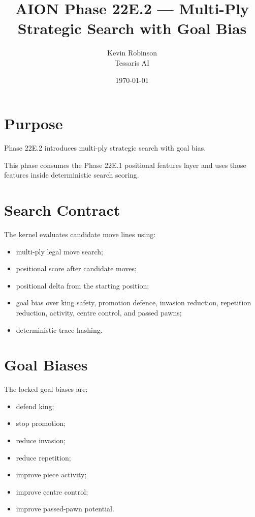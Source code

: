 \documentclass[11pt,a4paper]{article}
\title{\textbf{AION Phase 22E.2 --- Multi-Ply Strategic Search with Goal Bias}}
\author{Kevin Robinson\\Tessaris AI}
\date{\today}
\begin{document}
\maketitle

\section{Purpose}

Phase 22E.2 introduces multi-ply strategic search with goal bias.

This phase consumes the Phase 22E.1 positional features layer and uses those features inside deterministic search scoring.

\section{Search Contract}

The kernel evaluates candidate move lines using:

\begin{itemize}[leftmargin=*]
  \item multi-ply legal move search;
  \item positional score after candidate moves;
  \item positional delta from the starting position;
  \item goal bias over king safety, promotion defence, invasion reduction, repetition reduction, activity, centre control, and passed pawns;
  \item deterministic trace hashing.
\end{itemize}

\section{Goal Biases}

The locked goal biases are:

\begin{itemize}[leftmargin=*]
  \item defend king;
  \item stop promotion;
  \item reduce invasion;
  \item reduce repetition;
  \item improve piece activity;
  \item improve centre control;
  \item improve passed-pawn potential.
\end{itemize}
\end{document}

